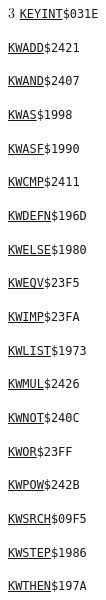 \begin{multicols}{3}
\noindent\hyperlink{l:KEYINT}{\texttt{KEYINT}}\hfill\texttt{\$031E~\phantom{000}\llap{\pageref{l:KEYINT}}}\par
\noindent\hyperlink{l:KWADD}{\texttt{KWADD}}\hfill\texttt{\$2421~\phantom{000}\llap{\pageref{l:KWADD}}}\par
\noindent\hyperlink{l:KWAND}{\texttt{KWAND}}\hfill\texttt{\$2407~\phantom{000}\llap{\pageref{l:KWAND}}}\par
\noindent\hyperlink{l:KWAS}{\texttt{KWAS}}\hfill\texttt{\$1998~\phantom{000}\llap{\pageref{l:KWAS}}}\par
\noindent\hyperlink{l:KWASF}{\texttt{KWASF}}\hfill\texttt{\$1990~\phantom{000}\llap{\pageref{l:KWASF}}}\par
\noindent\hyperlink{l:KWCMP}{\texttt{KWCMP}}\hfill\texttt{\$2411~\phantom{000}\llap{\pageref{l:KWCMP}}}\par
\noindent\hyperlink{l:KWDEFN}{\texttt{KWDEFN}}\hfill\texttt{\$196D~\phantom{000}\llap{\pageref{l:KWDEFN}}}\par
\noindent\hyperlink{l:KWELSE}{\texttt{KWELSE}}\hfill\texttt{\$1980~\phantom{000}\llap{\pageref{l:KWELSE}}}\par
\noindent\hyperlink{l:KWEQV}{\texttt{KWEQV}}\hfill\texttt{\$23F5~\phantom{000}\llap{\pageref{l:KWEQV}}}\par
\noindent\hyperlink{l:KWIMP}{\texttt{KWIMP}}\hfill\texttt{\$23FA~\phantom{000}\llap{\pageref{l:KWIMP}}}\par
\noindent\hyperlink{l:KWLIST}{\texttt{KWLIST}}\hfill\texttt{\$1973~\phantom{000}\llap{\pageref{l:KWLIST}}}\par
\noindent\hyperlink{l:KWMUL}{\texttt{KWMUL}}\hfill\texttt{\$2426~\phantom{000}\llap{\pageref{l:KWMUL}}}\par
\noindent\hyperlink{l:KWNOT}{\texttt{KWNOT}}\hfill\texttt{\$240C~\phantom{000}\llap{\pageref{l:KWNOT}}}\par
\noindent\hyperlink{l:KWOR}{\texttt{KWOR}}\hfill\texttt{\$23FF~\phantom{000}\llap{\pageref{l:KWOR}}}\par
\noindent\hyperlink{l:KWPOW}{\texttt{KWPOW}}\hfill\texttt{\$242B~\phantom{000}\llap{\pageref{l:KWPOW}}}\par
\noindent\hyperlink{l:KWSRCH}{\texttt{KWSRCH}}\hfill\texttt{\$09F5~\phantom{000}\llap{\pageref{l:KWSRCH}}}\par
\noindent\hyperlink{l:KWSTEP}{\texttt{KWSTEP}}\hfill\texttt{\$1986~\phantom{000}\llap{\pageref{l:KWSTEP}}}\par
\noindent\hyperlink{l:KWTHEN}{\texttt{KWTHEN}}\hfill\texttt{\$197A~\phantom{000}\llap{\pageref{l:KWTHEN}}}\par

\end{multicols}
